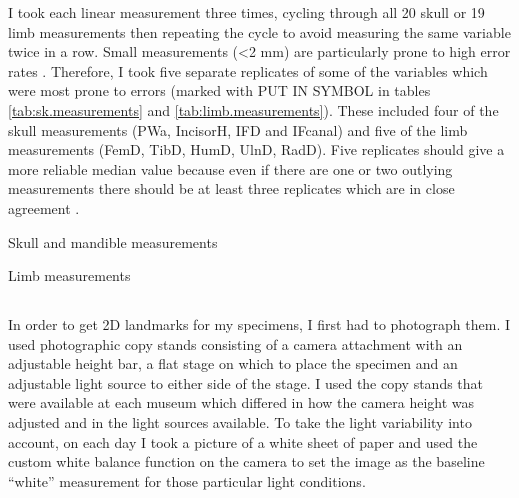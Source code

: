 	I took each linear measurement three times, cycling through all 20 skull or 19 limb measurements then repeating the cycle to avoid measuring the same variable twice in a row. Small measurements (<2 mm) are particularly prone to high error rates \citep{Cardini2008}. Therefore, I took five separate replicates of some of the variables which were most prone to errors (marked with PUT IN SYMBOL in tables \ref{tab:sk.measurements} and \ref{tab:limb.measurements}). These included four of the skull measurements (PWa, IncisorH, IFD and IFcanal) and five of the limb measurements (FemD, TibD, HumD, UlnD, RadD). 
	Five replicates should give a more reliable median value because even if there are one or two outlying measurements there should be at least three replicates which are in close agreement \citep{Cooper2009}.



\begin{table}[h]
	\caption[Description of the skull and mandible measurements]
			{Skull and mandible measurements}%
	
	\label{tab:sk.measurements}
\end{table}


\begin{table}[h]
	\caption[Description of the limb measurements]
		{Limb measurements} %
	
	\label{tab:limb.measurements}
\end{table}


\subsection{}

	In order to get 2D landmarks for my specimens, I first had to photograph them. I used photographic copy stands consisting of a camera attachment with an adjustable height bar, a flat stage on which to place the specimen and an adjustable light source to either side of the stage. I used the copy stands that were available at each museum which differed in how the camera height was adjusted and in the light sources available.
	To take the light variability into account, on each day I took a picture of a white sheet of paper and used the custom white balance function on the camera to set the image as the baseline “white” measurement for those particular light conditions.
	
